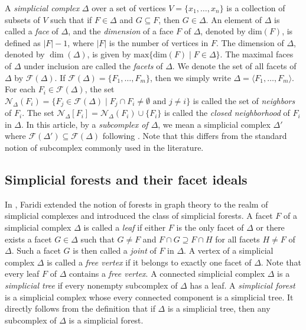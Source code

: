 \documentclass[12pt,a4paper,reqno]{amsart}
\theoremstyle{definition}
\def\D{\Delta}
\def\F{\mathcal{F}}
\def\N{\mathcal{N}}
\begin{document}
A \textit{simplicial complex} $\Delta$ over a set of vertices $V=\{x_1,\ldots ,x_n\}$ is a collection of subsets of $V$ such that if $F\in \Delta$ and $G\subseteq F$, then $ G\in \Delta$. An element of $\D$ is called a \textit{face} of $\D$, and the \textit{dimension} of a face $F$ of $\Delta$, denoted by $\mathrm{dim}(F)$, is defined as $|F|-1$, where $|F|$ is the number of vertices in $F$. The dimension of $\D$, denoted by $\dim(\D)$, is given by $\mathrm{max}\{\mathrm{dim}(F)\mid F\in \D\}$. %
The maximal faces of $\D$ under inclusion are called the \textit{facets} of $\D$. We denote the set of all facets of $\D$ by $\F(\D)$. If $\F(\D)=\{F_1,\ldots , F_m\}$, then we simply write $\D=\langle F_1,\ldots , F_m\rangle$. For each $F_i\in\F(\D)$, the set $\N_{\Delta}(F_i)=\{F_j\in\F(\Delta)\mid F_j\cap F_i\neq\emptyset\text{ and }j\neq i\}$ is called the set of {\it neighbors} of $F_i$. The set $\N_{\Delta}[F_i]=\N_{\Delta}(F_i)\cup\{F_i\}$ is called the {\it closed neighborhood} of $F_i$ in $\Delta$. In this article, by a \textit{subcomplex of $\D$}, we mean a simplicial complex $\D'$  where $\F(\D')\subseteq \F(\D)$ following \cite{Faridi2002}. Note that this differs from the standard notion of subcomplex commonly used in the literature.

\subsection{Simplicial forests and their facet ideals} In \cite{Faridi2002}, Faridi extended the notion of forests in graph theory to the realm of simplicial complexes and introduced the class of simplicial forests. A facet $F$ of a simplicial complex $\D$ is called a \textit{leaf} if either $F$ is the only facet of $\D$ or there exists a facet $G \in \D$ such that $G\neq F$ and $F \cap G \supseteq F \cap H$ for all facets $H \neq F$ of $\D$. Such a facet $G$ is then called a \textit{joint} of $F$ in $\D$. 
A vertex of a simplicial complex $\D$ is called a \textit{free vertex} if it belongs to exactly one facet of $\D$. Note that every leaf $F$ of $\D$ contains a \textit{free vertex}. A connected simplicial complex $\D$ is a \textit{simplicial tree} if every nonempty subcomplex of $\D$ has a leaf. A {\it simplicial forest} is a simplicial complex whose every connected component is a simplicial tree. It directly follows from the definition that if $\D$ is a simplicial tree, then any subcomplex of $\D$ is a simplicial forest.
\end{document}
